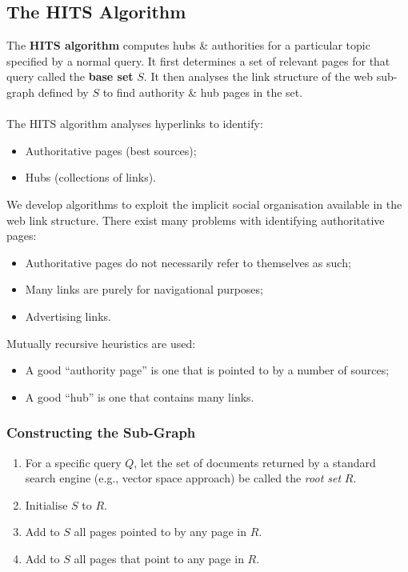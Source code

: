 \documentclass[a4paper,11pt]{article}
\begin{document}
\subsection{The HITS Algorithm}
The \textbf{HITS algorithm} computes hubs \& authorities for a particular topic specified by a normal query.
It first determines a set of relevant pages for that query called the \textbf{base set} $S$.
It then analyses the link structure of the web sub-graph defined by $S$ to find authority \& hub pages in the set.
\\\\
The HITS algorithm analyses hyperlinks to identify:
\begin{itemize}
    \item   Authoritative pages (best sources);
    \item   Hubs (collections of links).
\end{itemize}

We develop algorithms to exploit the implicit social organisation available in the web link structure.
There exist many problems with identifying authoritative pages:
\begin{itemize}
    \item   Authoritative pages do not necessarily refer to themselves as such;
    \item   Many links are purely for navigational purposes;
    \item   Advertising links.
\end{itemize}

Mutually recursive heuristics are used:
\begin{itemize}
    \item   A good ``authority page'' is one that is pointed to by a number of sources; 
    \item   A good ``hub'' is one that contains many links.
\end{itemize}

\subsubsection{Constructing the Sub-Graph}
\begin{enumerate}
    \item   For a specific query $Q$, let the set of documents returned by a standard search engine (e.g., vector space approach) be called the \textit{root set} $R$.
    \item   Initialise $S$ to $R$.
    \item   Add to $S$ all pages pointed to by any page in $R$.
    \item   Add to $S$ all pages that point to any page in $R$.
\end{enumerate}
\end{document}
